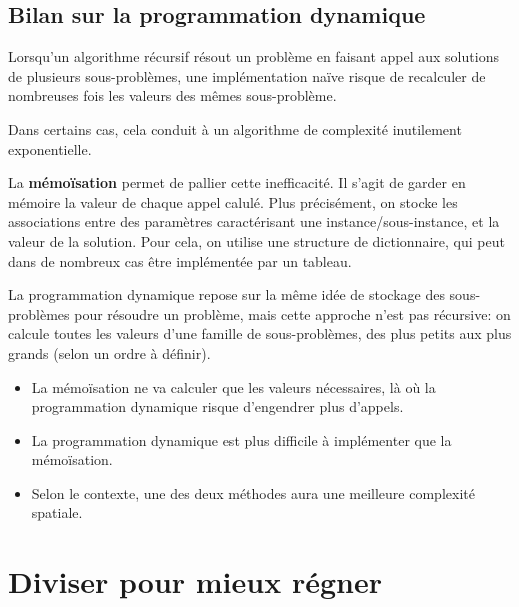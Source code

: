 \documentclass{scrartcl}
\begin{document}
		\subsection{Bilan sur la programmation dynamique}
			Lorsqu'un algorithme récursif résout un problème en faisant appel aux solutions de plusieurs sous-problèmes,
			une implémentation naïve risque de recalculer de nombreuses fois les valeurs des mêmes sous-problème.

			Dans certains cas, cela conduit à un algorithme de complexité inutilement exponentielle.

			La \textbf{mémoïsation} permet de pallier cette inefficacité.
			Il s'agit de garder en mémoire la valeur de chaque appel calulé. 
			Plus précisément, on stocke les associations entre des paramètres caractérisant une instance/sous-instance, et la valeur de la solution.
			Pour cela, on utilise une structure de dictionnaire, qui peut dans de nombreux cas être implémentée par un tableau.

			La programmation dynamique repose sur la même idée de stockage des sous-problèmes pour résoudre un problème, 
			mais cette approche n'est pas récursive: on calcule toutes les valeurs d'une famille de sous-problèmes, des plus petits aux plus grands 
			(selon un ordre à définir).

			\begin{itemize}
				\item La mémoïsation ne va calculer que les valeurs nécessaires, là où la programmation dynamique risque d'engendrer plus d'appels.
				\item La programmation dynamique est plus difficile à implémenter que la mémoïsation.
				\item Selon le contexte, une des deux méthodes aura une meilleure complexité spatiale.
			\end{itemize}
	
	\section{Diviser pour mieux régner}
\end{document}
